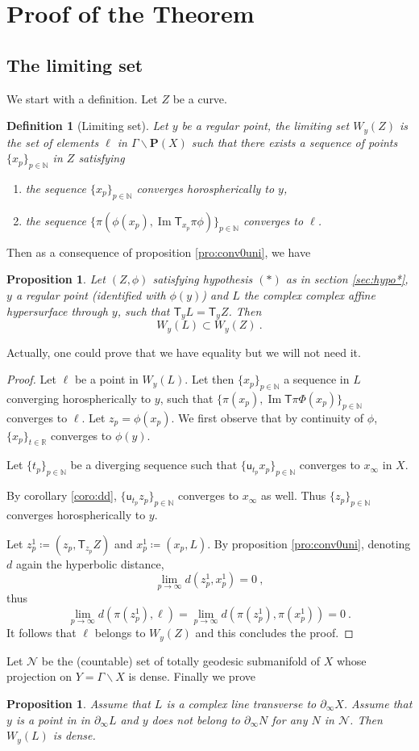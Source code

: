 \documentclass[12pt,reqno]{amsart}
\newtheorem{proposition}[theorem]{Proposition}
\newtheorem{definition}[theorem]{Definition}
\newcommand{\T}{\ms T}
\newcommand{\ms}{\mathsf}
\newcommand{\mc}{\mathcal}
\newcommand{\defeq}{\coloneqq}
\newcommand{\bX}{\partial_\infty X}
\newcommand{\im}{\operatorname{Im}}
\newcommand{\bP}{{\mathbf P}}
\newcommand{\uu}{\mathsf u}
\newcommand{\seq}[1]{ \{{#1}_p\}_{p\in\mathbb N}}
\newcommand{\seqp}[1]{ \{{#1}\}_{p\in\mathbb N}}
\newcommand{\seqt}[1]{ \{{#1}\}_{t\in\mathbb R}}
\begin{document}
\section{Proof of the Theorem}
\subsection{The limiting set}
We start with a definition. Let $Z$ be a curve.
\begin{definition}[\sc Limiting set]
Let $y$ be  a regular point, the  {\em limiting set} $W_y(Z)$ is the set of elements $\ell$ in  $\Gamma\backslash \bP(X)$ such that there exists a sequence of points  $\seq{x}$ in $Z$ satisfying  \begin{enumerate}
	\item  the sequence $\seq{x}$ converges horospherically to  $y$,
	\item  the sequence $\seqp{\pi(\phi(x_p),\im\T_{x_p}\pi\phi)}$ converges to $\ell$.
	\end{enumerate}	
\end{definition}

Then as a consequence of proposition \ref{pro:conv0uni}, we have

\begin{proposition}
	\label{pro:lem1} Let $(Z,\phi)$ satisfying hypothesis $(*)$ as in section \ref{sec:hypo*}, $y$ a regular point (identified with $\phi(y)$) and $L$ the complex complex affine hypersurface through $y$, such that $\T_yL=\T_y Z$. Then
$$
W_y(L)\subset W_y(Z)\ .	
$$
\end{proposition}
Actually, one could prove that we have equality but we will not need it.
\begin{proof}
Let $\ell$ be a point in $W_y(L)$. Let then $\seq{x}$ a  sequence in  $L$ converging horospherically to $y$, such that $\seqp{\pi(x_p),\im\T\pi\Phi(x_p)}$ converges to $\ell$. Let $z_p=\phi(x_p)$. We first observe that by continuity of $\phi$, $\seqt{x_p}$ converges to $\phi(y)$. 

Let $\seq{t}$ be a diverging sequence  such that $\seqp{\uu_{t_p}x_p}$ converges to $x_\infty$ in $X$.

By corollary  \ref{coro:dd}, $\seqp{\uu_{t_p}z_p}$ converges to $x_\infty$ as well. Thus $\seq{z}$ converges horospherically to $y$.

Let $z^1_p\defeq(z_p,\T_{z_p}Z)$ and $x^1_p\defeq (x_p,L)$. By proposition \ref{pro:conv0uni}, denoting $d$ again the hyperbolic distance, 
$$
\lim_{p\to\infty}d(z^1_p,x^1_p)=0\ ,
$$
thus 
$$
\lim_{p\to\infty}d(\pi(z^1_p),\ell)=\lim_{p\to\infty}d(\pi(z^1_p),\pi(x^1_p))=0\ .
$$
It follows that $\ell$ belongs to $W_y(Z)$ and 
this concludes the proof.
\end{proof}
Let $\mc N$ be the (countable) set of totally geodesic submanifold of $X$ whose projection on $Y=\Gamma\backslash X$ is dense.
Finally we prove 
\begin{proposition}\label{pro:wldense}
	Assume that $L$ is a complex line  transverse to $\bX$. Assume that $y$ is a  point in  in $\partial_\infty L$ and $y$  does not belong to  $\partial_\infty N$ for any $N$ in $\mc N$.
	Then $W_y(L)$ is dense.
\end{proposition}
\end{document}
